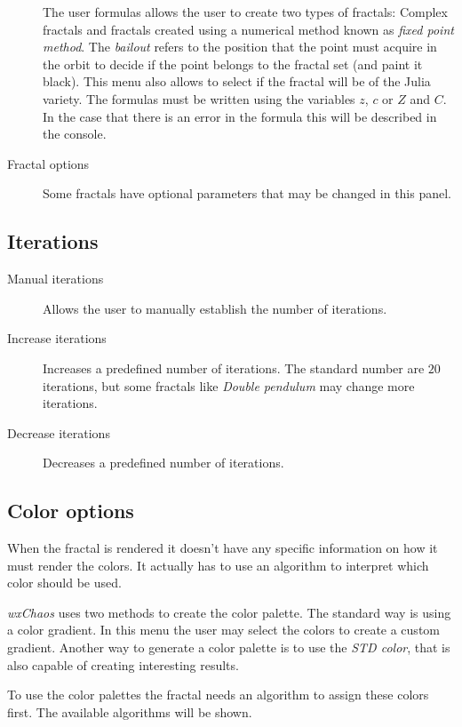\documentclass[oneside]{book}
\begin{document}
\begin{description}
The user formulas allows the user to create two types of fractals: Complex fractals and fractals created using a numerical method known as \textit{fixed point method}. The \textit{bailout} refers to the position that the point must acquire in the orbit to decide if the point belongs to the fractal set (and paint it black). This menu also allows to select if the fractal will be of the Julia variety. The formulas must be written using the variables $z$, $c$ or $Z$ and $C$. In the case that there is an error in the formula this will be described in the console.

\item[Fractal options] Some fractals have optional parameters that may be changed in this panel.
\end{description}

\subsection{Iterations}

\begin{description}
\item[Manual iterations] Allows the user to manually establish the number of iterations.
\item[Increase iterations] Increases a predefined number of iterations. The standard number are $20$ iterations, but some fractals like \textit{Double pendulum} may change more iterations.
\item[Decrease iterations] Decreases a predefined number of iterations.
\end{description}

\subsection{Color options}
When the fractal is rendered it doesn't have any specific information on how it must render the colors. It actually has to use an algorithm to interpret which color should be used.

\textit{wxChaos} uses two methods to create the color palette. The standard way is using a color gradient. In this menu the user may select the colors to create a custom gradient. Another way to generate a color palette is to use the \textit{STD color}, that is also capable of creating interesting results.

To use the color palettes the fractal needs an algorithm to assign these colors first. The available algorithms will be shown.
\end{document}
